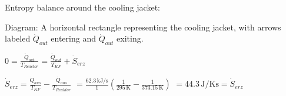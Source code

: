Entropy balance around the cooling jacket:  

Diagram: A horizontal rectangle representing the cooling jacket, with arrows labeled \( \dot{Q}_{out} \) entering and \( \dot{Q}_{out} \) exiting.  

\( 0 = \frac{\dot{Q}_{out}}{T_{Reactor}} = \frac{\dot{Q}_{out}}{T_{KF}} + \dot{S}_{erz} \)

\( \dot{S}_{erz} = \frac{\dot{Q}_{aus}}{T_{KF}} - \frac{\dot{Q}_{aus}}{T_{Reaktor}} \)  
\( = \frac{62.3 \, \text{kJ/s}}{1} \left( \frac{1}{295 \, \text{K}} - \frac{1}{373.15 \, \text{K}} \right) \)  
\( = 44.3 \, \text{J/Ks} = \dot{S}_{erz} \)